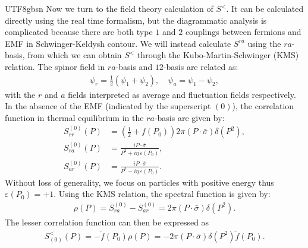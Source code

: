 \documentclass[11pt]{article}\def\baselinestretch{1.4}
\def\d{{\delta}}
\def\p{{\pi}}
\def\s{{\sigma}}
\begin{document}
\begin{CJK}{UTF8}{gbsn}
Now we turn to the field theory calculation of $S^<$. It can be calculated directly using the real time formalism, but the diagrammatic analysis is complicated because there are both type $1$ and $2$ couplings between fermions and EMF in Schwinger-Keldysh contour. We will instead calculate $S^{ra}$ using the $ra$-basis, from which we can obtain $S^<$ through the Kubo-Martin-Schwinger (KMS) relation. 
The spinor field in $ra$-basis and $12$-basis are related as:
\begin{align}
    \psi _r = \frac{1}{2}(\psi _1 + \psi _2), \quad \psi _a = \psi _1 - \psi _2,
\end{align}
with the $r$ and $a$ fields interpreted as average and fluctuation fields respectively.
In the absence of the EMF (indicated by the superscript $(0)$), the correlation function in thermal equilibrium in the $ra$-basis are given by:
\begin{align}
    S_{rr}^{(0)}(P)&=(\frac{1}{2}+f(P_0))2\p(P\cdot\bar{\s})\d(P^2),\label{S_prop1}\\
    S_{ra}^{(0)}(P)&=\frac{iP \cdot \bar{\sigma}}{P^2+i \eta\,\varepsilon(P_0)}, \label{S_prop2}\\
    S_{ar}^{(0)}(P)&=\frac{iP \cdot \bar{\sigma}}{P^2-i \eta\,\varepsilon(P_0)}.\label{S_prop3}
\end{align}
Without loss of generality, we focus on particles with positive energy thus $\varepsilon(P_0)=+1$. Using the KMS relation, the spectral function is given by:
\begin{align}
    \rho (P) = S_{ra}^{(0)}-S_{ar}^{(0)} = 2\pi (P \cdot \bar{\sigma})\delta (P^2) .\label{spectral_function}
\end{align}
The lesser correlation function can then be expressed as
\begin{align}
    S^<_{(0)}(P)=-\tilde{f}(P_0)\rho (P)=-2\pi (P \cdot \bar{\sigma})\delta (P^2)\tilde{f}(P_0) \label{free_lesser_propagator}.
\end{align}


\end{CJK}
\end{document}
